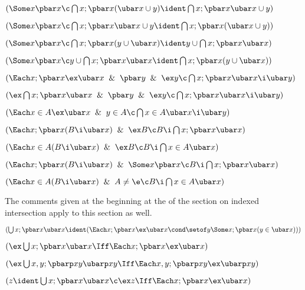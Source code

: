  $(\Some x \pbar x \c \bigcap x;\pbar x(\ubar x \cup y)
	\ident \bigcap x;\pbar x\ubar x\cup y)$

 $(\Some x \pbar x \c \bigcap x;\pbar x\ubar x \cup y
	\ident \bigcap x;\pbar x(\ubar x\cup y))$

 $(\Some x \pbar x \c \bigcap x;\pbar x(y \cup \ubar x)
	\ident y \cup \bigcap x;\pbar x\ubar x)$

 $(\Some x \pbar x \c y \cup \bigcap x;\pbar x\ubar x 
	\ident \bigcap x;\pbar x(y \cup \ubar x))$

 $(\Each x;\pbar x \ex \ubar x \And \pbar y \And \ex y 
	\c \bigcap x;\pbar x \ubar x \i \ubar y)$

 $(\ex \bigcap x;\pbar x \ubar x \And \pbar y \And \ex y
	\c \bigcap x;\pbar x \ubar x \i \ubar y)$

 $(\Each x \in A \ex \ubar x \And y \in A
	\c \bigcap x \in A \ubar x \i \ubar y)$

 $(\Each x;\pbar x (B \i \ubar x) \And \ex B
	\c B \i \bigcap x;\pbar x \ubar x)$

 $(\Each x \in A (B \i \ubar x) \And \ex B
	\c B \i \bigcap x \in A \ubar x)$

 $(\Each x;\pbar x (B \i \ubar x) \And \Some x \pbar x
	\c B \i \bigcap x;\pbar x \ubar x)$

 $(\Each x \in A (B \i \ubar x) \And A \ne \e 
	\c B \i \bigcap x \in A \ubar x)$
\lineb



The comments given at the beginning at the of the section on indexed
intersection apply to this section as well.
\lineb


 $(\bigcup x ;\pbar x \ubar x \ident (\Each x;\pbar x \ex \ubar x
\cond \setof y \Some x;\pbar x (y \in \ubar x)))$



 $(\ex \bigcup x; \pbar x \ubar x \Iff
\Each x; \pbar x \ex \ubar x)$

 $(\ex \bigcup x,y; \pbarp xy \ubarp xy \Iff
\Each x,y; \pbarp xy \ex \ubarp xy)$

 $(z \ident \bigcup x; \pbar x \ubar x \c
\ex z \Iff \Each x ; \pbar x \ex \ubar x)$

